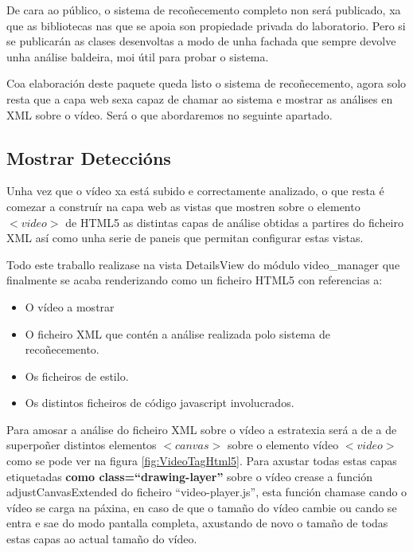             De cara ao público, o sistema de recoñecemento completo non será publicado, xa que as 
            bibliotecas nas que se apoia son propiedade privada do laboratorio. Pero si se 
            publicarán as clases desenvoltas a modo de unha fachada que sempre devolve unha análise
            baldeira, moi útil para probar o sistema. 
            
            Coa elaboración deste paquete queda listo o sistema de recoñecemento, agora solo resta que a capa web
            sexa capaz de chamar ao sistema e mostrar as análises en XML sobre o vídeo. Será o que abordaremos
            no seguinte apartado.

    \subsection{Mostrar Deteccións}
        
        Unha vez que o vídeo xa está subido e correctamente analizado, o que resta é comezar a construír
        na capa web as vistas que mostren sobre o elemento $<video>$ de HTML5 as distintas capas de 
        análise obtidas a partires do ficheiro XML así como unha serie de paneis que permitan 
        configurar estas vistas.
        
        Todo este traballo realizase na vista DetailsView do módulo video\_manager que finalmente se
        acaba renderizando como un ficheiro HTML5 con referencias a:
        \begin{itemize}
        \item O vídeo a mostrar
        \item O ficheiro XML que contén a análise realizada polo sistema de recoñecemento.
        \item Os ficheiros de estilo.
        \item Os distintos ficheiros de código javascript involucrados.
        \end{itemize}
        
        Para amosar a análise do ficheiro XML sobre o vídeo a estratexia será a de a de superpoñer 
        distintos elementos $<canvas>$ sobre o elemento vídeo $<video>$ como se pode ver na figura 
        \ref{fig:VideoTagHtml5}. Para axustar todas estas capas etiquetadas 
        \textbf{como class=``drawing-layer''}
        sobre o vídeo crease a función adjustCanvasExtended do ficheiro ``video-player.js'', esta función 
        chamase cando o vídeo se carga na páxina, en caso de que o tamaño do vídeo cambie ou cando se 
        entra e sae do modo pantalla completa, axustando de novo o tamaño de todas estas capas ao actual
        tamaño do vídeo.
        
